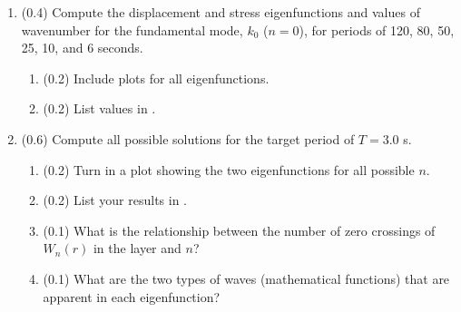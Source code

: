 \documentclass[11pt,titlepage,fleqn]{article}
\newcommand{\tfilemainB}{{\tt hw\_modesB.ipynb}}
\newcommand{\tfilessB}{{\tt surf\_stress\_love.py}}
\begin{document}
\begin{enumerate}
\begin{enumerate}
\item (0.0) What is the normalized value of stress at the surface, $T(r_a)\,/\max(|T(r)|)$?

\item (1.0) Check the system of equations () for this solution (see \tfilemainB). You should get much better agreement if you lower the tolerance levels for \sfind\ by changing \maxstep\ (in \tfilemainB).

Show your code and output to demonstrate your findings.
(Do not show the already-provided code \tfilessB.)

\item (0.0) What is the normalized value of stress at the surface, $T(r_a)\,/\max(|T(r)|)$?

After you do the check, you can go back to using the default tolerance.
\end{enumerate}


\item (0.4) Compute the displacement and stress eigenfunctions and values of wavenumber for the fundamental mode, $k_0$ ($n=0$), for periods of 120, 80, 50, 25, 10, and 6 seconds.

\begin{enumerate}
\item (0.2) Include plots for all eigenfunctions.

\item (0.2) List values in .
\end{enumerate}


\item (0.6) Compute all possible solutions for the target period of $T = 3.0$ s.
%
\begin{enumerate}
\item (0.2) Turn in a plot showing the two eigenfunctions for all possible $n$.

\item (0.2) List your results in .

\item (0.1) What is the relationship between the number of zero crossings of $W_n(r)$ in the layer and $n$?
\item (0.1) What are the two types of waves (\ie mathematical functions) that are apparent in each eigenfunction?
\end{enumerate}


\end{enumerate}
\end{document}

